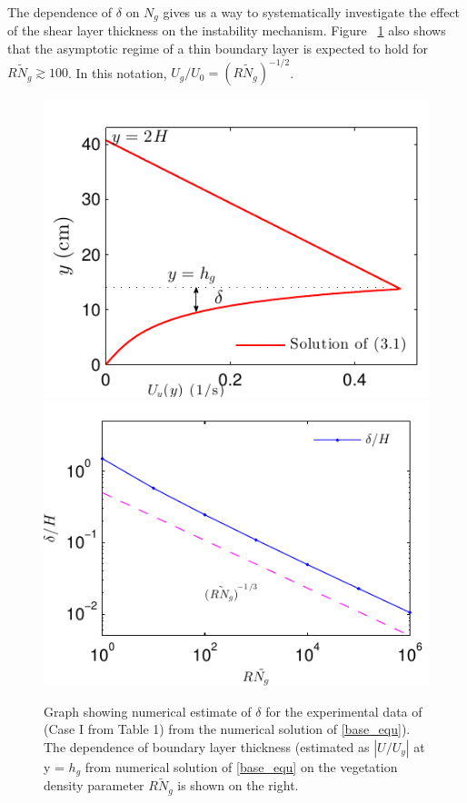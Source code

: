 \documentclass[12pt]{report}   %
\newcommand{\Rey}{{R}}
\newcommand{\Ndg}{\tilde{N}_g}
\newcommand{\monami}{\textit{monami}}
\newcommand{\ReyNdg}{{\Rey\Ndg}}
\begin{document}
The dependence of $\delta$ on $N_g$ gives us a way to systematically investigate the effect of the shear layer thickness on the instability mechanism.
Figure ~\ref{Uy_base} also shows that the asymptotic regime of a thin boundary layer is expected to hold for $\ReyNdg \gtrsim 100$. 
In this notation, $U_g/U_0 = (\Rey \Ndg)^{-1/2}$. 
\begin{figure}
\centerline{\includegraphics[scale=1.]{Grass_Base_Nepf_shear_scale} \includegraphics[scale=1.]{Grass_shear_scale}}
\caption[Numerical estimate of shear thickness for experimental data]{Graph showing numerical estimate of $\delta$ for the experimental data of \cite{Nepf04} (Case I from Table 1) from the numerical solution of \eqref{base_equ}). The dependence of boundary layer thickness (estimated as $|U/U_y|$ at y = $h_g$ from numerical solution of \ref{base_equ} on the vegetation density parameter $R\Ndg$ is shown on the right.
}
\label{Uy_base}
\end{figure}
\end{document}

